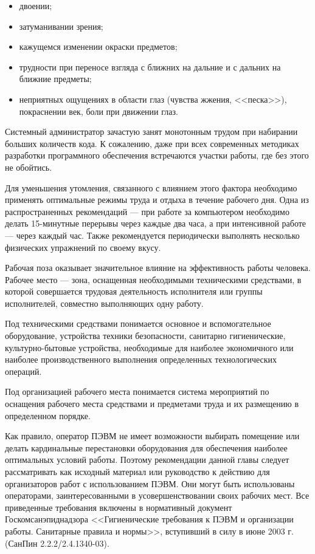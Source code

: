 \begin{itemize}
  \item двоении;
  \item затуманивании зрения;
  \item кажущемся изменении окраски предметов;
  \item трудности при переносе взгляда с ближних на дальние и с дальних на ближние предметы;
  \item неприятных ощущениях в области глаз (чувства жжения, <<песка>>), покраснении век, боли при движении глаз.
\end{itemize}

Системный администратор зачастую занят монотонным трудом при набирании больших количеств кода. К сожалению, даже при всех современных методиках разработки программного обеспечения встречаются участки работы, где без этого не обойтись. 

Для уменьшения утомления, связанного с влиянием этого фактора необходимо применять оптимальные режимы труда и отдыха в течение рабочего дня. Одна из распространенных рекомендаций --- при работе за компьютером необходимо делать 15-минутные перерывы через каждые два часа, а при интенсивной работе --- через каждый час. Также рекомендуется периодически выполнять несколько физических упражнений по своему вкусу.

Рабочая поза оказывает значительное влияние на эффективность работы человека. Рабочее место --- зона, оснащенная необходимыми техническими средствами, в которой совершается трудовая деятельность исполнителя или группы исполнителей, совместно выполняющих одну работу.

Под техническими средствами понимается основное и вспомогательное оборудование, устройства техники безопасности, санитарно гигиенические, культурно-бытовые устройства, необходимые для наиболее экономичного или наиболее производственного выполнения определенных технологических операций.

Под организацией рабочего места понимается система мероприятий по оснащения рабочего места средствами и предметами труда и их размещению в определенном порядке.

Как правило, оператор ПЭВМ не имеет возможности выбирать помещение или делать кардинальные перестановки оборудования для обеспечения наиболее оптимальных условий работы.
Поэтому рекомендации данной главы следует рассматривать как исходный материал или руководство к действию для организаторов работ с использованием ПЭВМ.
Они могут быть использованы операторами, заинтересованными в усовершенствовании своих рабочих мест.
Все приведенные требования включены в нормативный документ Госкомсанэпиднадзора <<Гигиенические требования к ПЭВМ и организации работы. Санитарные правила и нормы>>, вступивший в силу в июне 2003 г. (СанПин 2.2.2/2.4.1340-03).

